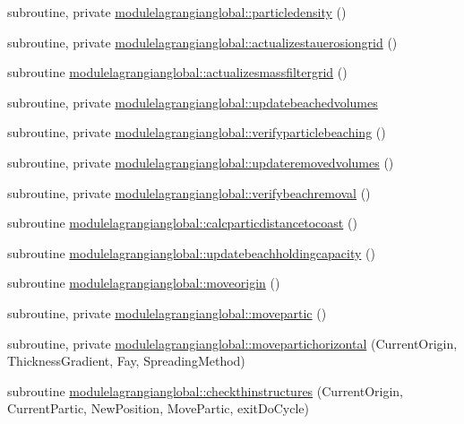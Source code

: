 \begin{DoxyCompactItemize}
subroutine, private \mbox{\hyperlink{namespacemodulelagrangianglobal_ab8679a80515beaf8591834517dac26d2}{modulelagrangianglobal\+::particledensity}} ()
\item 
subroutine, private \mbox{\hyperlink{namespacemodulelagrangianglobal_a1ed2a4fd6026ab2cae60ca5e59d48c5c}{modulelagrangianglobal\+::actualizestauerosiongrid}} ()
\item 
subroutine \mbox{\hyperlink{namespacemodulelagrangianglobal_a9f884711ce254712333517d3851888e9}{modulelagrangianglobal\+::actualizesmassfiltergrid}} ()
\item 
subroutine, private \mbox{\hyperlink{namespacemodulelagrangianglobal_a64f9a95bbf347c4a3b9599b01ab16129}{modulelagrangianglobal\+::updatebeachedvolumes}}
\item 
subroutine, private \mbox{\hyperlink{namespacemodulelagrangianglobal_a2d56e0e16cf1181052cd535803200b87}{modulelagrangianglobal\+::verifyparticlebeaching}} ()
\item 
subroutine, private \mbox{\hyperlink{namespacemodulelagrangianglobal_a43b7c49b0fc50c80ec9c87139197e60b}{modulelagrangianglobal\+::updateremovedvolumes}} ()
\item 
subroutine, private \mbox{\hyperlink{namespacemodulelagrangianglobal_aa5dd026eab84c8d529a778738099f2a9}{modulelagrangianglobal\+::verifybeachremoval}} ()
\item 
subroutine \mbox{\hyperlink{namespacemodulelagrangianglobal_a93a1f184ec51e9c61c7ac05ecf8d9364}{modulelagrangianglobal\+::calcparticdistancetocoast}} ()
\item 
subroutine \mbox{\hyperlink{namespacemodulelagrangianglobal_a339c78433f179a296304ed03a3fcfae9}{modulelagrangianglobal\+::updatebeachholdingcapacity}} ()
\item 
subroutine \mbox{\hyperlink{namespacemodulelagrangianglobal_a214f6221918e0904f9300fa3b9a00cb3}{modulelagrangianglobal\+::moveorigin}} ()
\item 
subroutine, private \mbox{\hyperlink{namespacemodulelagrangianglobal_a82279a8ab7ce219fe5a1bfff091e611f}{modulelagrangianglobal\+::movepartic}} ()
\item 
subroutine, private \mbox{\hyperlink{namespacemodulelagrangianglobal_ab81fef0d1f9d7e83be8f27e7313bf968}{modulelagrangianglobal\+::movepartichorizontal}} (Current\+Origin, Thickness\+Gradient, Fay, Spreading\+Method)
\item 
subroutine \mbox{\hyperlink{namespacemodulelagrangianglobal_a48ae2541ace36a54cdc28eebb4617d29}{modulelagrangianglobal\+::checkthinstructures}} (Current\+Origin, Current\+Partic, New\+Position, Move\+Partic, exit\+Do\+Cycle)

\end{DoxyCompactItemize}
